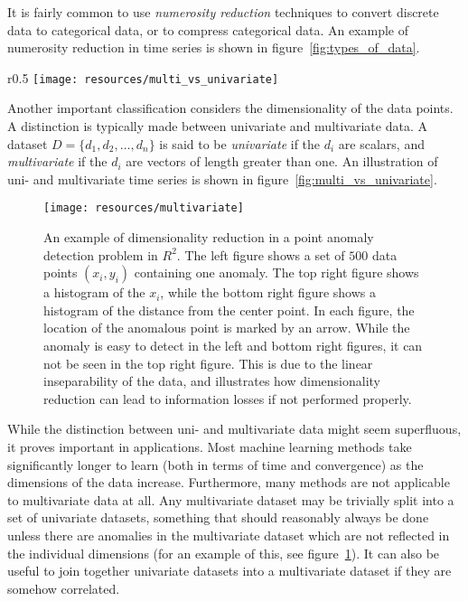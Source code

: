 It is fairly common to use \emph{numerosity reduction} techniques to convert discrete data to categorical data, or to compress categorical data. An example of numerosity reduction in time series is shown in figure~\ref{fig:types_of_data}.

\begin{wrapfigure}{r}{0.5\textwidth}
    \texttt{[image: resources/multi\_vs\_univariate]}
    \caption{{\small Two sine curves regarded as two separate univariate time series (dotted lines) and as one multivariate time series (solid lines).}}
\label{fig:multi_vs_univariate}
\end{wrapfigure}

Another important classification considers the dimensionality of the data points. A distinction is typically made between univariate and multivariate data. A dataset $D = \{d_1, d_2, \dots, d_n\}$ is said to be \emph{univariate} if the $d_i$ are scalars, and \emph{multivariate} if the $d_i$ are vectors of length greater than one. An illustration of uni- and multivariate time series is shown in figure~\ref{fig:multi_vs_univariate}.

\begin{figure}[htb]
\begin{center}
\leavevmode
\texttt{[image: resources/multivariate]}
\end{center}
\caption{\small{An example of dimensionality reduction in a point anomaly detection problem in $R^2$. The left figure shows a set of $500$ data points $(x_i, y_i)$ containing one anomaly. The top right figure shows a histogram of the $x_i$, while the bottom right figure shows a histogram of the distance from the center point. In each figure, the location of the anomalous point is marked by an arrow. While the anomaly is easy to detect in the left and bottom right figures, it can not be seen in the top right figure. This is due to the linear inseparability of the data, and illustrates how dimensionality reduction can lead to information losses if not performed properly.}}
\label{fig:dimensionality_reduction}
\end{figure}

While the distinction between uni- and multivariate data might seem superfluous, it proves important in applications. Most machine learning methods take significantly longer to learn (both in terms of time and convergence) as the dimensions of the data increase. Furthermore, many methods are not applicable to multivariate data at all. Any multivariate dataset may be trivially split into a set of univariate datasets, something that should reasonably always be done unless there are anomalies in the multivariate dataset which are not reflected in the individual dimensions (for an example of this, see figure~\ref{fig:dimensionality_reduction}). It can also be useful to join together univariate datasets into a multivariate dataset if they are somehow correlated.


